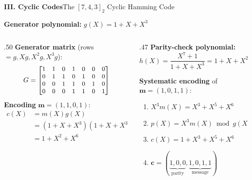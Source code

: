\begin{frame}{\textbf{III. Cyclic Codes}}{The $[7,4,3]_2$ Cyclic Hamming Code}

\textbf{Generator polynomial:} $g(X) = 1+X+X^3$

\medskip
\begin{columns}[T]
  \begin{column}{.50\textwidth}
    \textbf{Generator matrix} (rows $= g,Xg,X^2g,X^3g$):
    \[\small
    G = \begin{bmatrix}
    1 & 1 & 0 & 1 & 0 & 0 & 0\\
    0 & 1 & 1 & 0 & 1 & 0 & 0\\
    0 & 0 & 1 & 1 & 0 & 1 & 0\\
    0 & 0 & 0 & 1 & 1 & 0 & 1
    \end{bmatrix}
    \]
    \textbf{Encoding} $\mathbf{m}=(1,1,0,1)$:
    \begin{align*}
      c(X) &= m(X)g(X)\\
           &= (1+X+X^3)(1+X+X^3)\\
           &= 1+X^2+X^6
    \end{align*}
  \end{column}
  \begin{column}{.47\textwidth}
    \textbf{Parity-check polynomial:}
    \[h(X)=\frac{X^7+1}{1+X+X^3}=1+X+X^2+X^4\]

    \medskip
    \textbf{Systematic encoding} of $\mathbf{m}=(1,0,1,1)$:
    \begin{enumerate}\small
      \item $X^3 m(X) = X^3+X^5+X^6$
      \item $p(X) = X^3m(X)\bmod g(X) = 1$
      \item $c(X) = 1+X^3+X^5+X^6$
      \item $\mathbf{c} = (\underbrace{1,0,0}_{\text{parity}},\underbrace{1,0,1,1}_{\text{message}})$
    \end{enumerate}
  \end{column}
\end{columns}
\end{frame}

